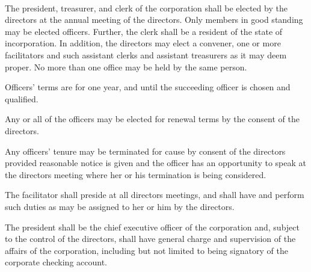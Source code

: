 \begin{art} ~
\begin{asec}[Election]

The president, treasurer, and clerk of the corporation shall be
elected by the directors at the annual meeting of the directors.
Only members in good standing may be elected officers.  Further,
the clerk shall be a resident of the state of incorporation.  In
addition, the directors may elect a convener, one or more
facilitators and such assistant clerks and assistant treasurers as
it may deem proper.  No more than one office may be held by the
same person.
\end{asec}

\begin{asec}[Tenure]

Officers' terms are for one year, and until the succeeding officer
is chosen and qualified.

\end{asec}

\begin{asec}

Any or all of the officers may be elected for renewal terms by the
consent of the directors.

\end{asec}

\begin{asec}

Any officers' tenure may be terminated for cause by consent of the
directors provided reasonable notice is given and the officer has
an opportunity to speak at the directors meeting where her or his
termination is being considered.

\end{asec}

\begin{asec}

The facilitator shall preside at all directors meetings, and shall
have and perform such duties as may be assigned to her or him by
the directors.

\end{asec}

\begin{asec}

The president shall be the chief executive officer of the
corporation and, subject to the control of the directors, shall
have general charge and supervision of the affairs of the
corporation, including but not limited to being signatory of the
corporate checking account.


\end{asec}
\end{art}
